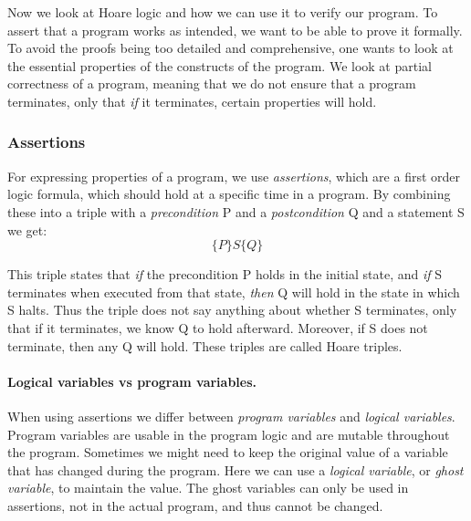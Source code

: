 Now we look at Hoare logic and how we can use it to verify our program.
To assert that a program works as intended, we want to be able to prove it formally. To avoid the proofs being too detailed and comprehensive, one wants to look at the essential properties of the constructs of the program. We look at partial correctness of a program, meaning that we do not ensure that a program terminates, only that \textit{if} it terminates, certain properties will hold.

\subsubsection{Assertions}
For expressing properties of a program, we use \textit{assertions}, which are a first order logic formula, which should hold at a specific time in a program.
By combining these into a triple with a \textit{precondition} P and a \textit{postcondition} Q and a statement S we get:
$$ \{ P \} S \{ Q \} $$

This triple states that \textit{if} the precondition P holds in the initial state, and \textit{if} S terminates when executed from that state, \textit{then} Q will hold in the state in which S halts.
Thus the triple does not say anything about whether S terminates, only that if it terminates, we know Q to hold afterward. Moreover, if S does not terminate, then any Q will hold. These triples are called Hoare triples.

\paragraph{Logical variables vs program variables.}
When using assertions we differ between \textit{program variables} and \textit{logical variables}.
Program variables are usable in the program logic and are mutable throughout the program.
Sometimes we might need to keep the original value of a variable that has changed during the program. Here we can use a \textit{logical variable}, or \textit{ghost variable}, to maintain the value. The ghost variables can only be used in assertions, not in the actual program, and thus cannot be changed.

